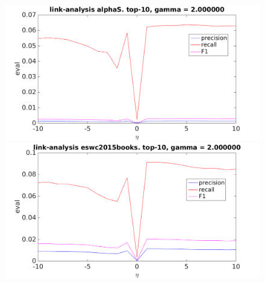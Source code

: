 \begin{figure}[h!]
\centering
\begin{minipage}{.5\textwidth}
    \centering
    \includegraphics[width=\linewidth]{fig/link_eta/alphaS_link_eta.png}
\end{minipage}%
\begin{minipage}{.5\textwidth}
    \centering
    \includegraphics[width=\linewidth]{fig/link_eta/eswc2015books_link_eta.png}
\end{minipage}
\end{figure}

